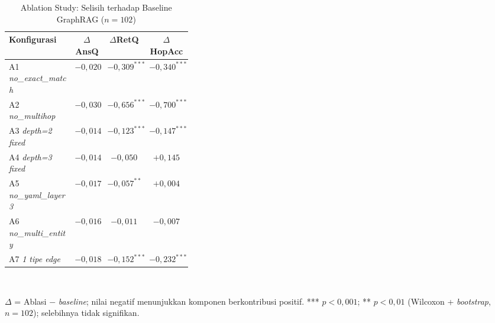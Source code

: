 \begin{table}[t]
\caption{Ablation Study: Selisih terhadap Baseline GraphRAG ($n=102$)}
\label{tbl:ablasi}
\centering
\begin{footnotesize}
\begin{tabular}{|p{0.36\linewidth}|c|c|c|}
\hline
\textbf{Konfigurasi} & \textbf{$\Delta$AnsQ} & \textbf{$\Delta$RetQ} & \textbf{$\Delta$HopAcc} \\
\hline
A1 \textit{no\_exact\_match} & $-0{,}020$ & $-0{,}309^{***}$ & $-0{,}340^{***}$ \\
\hline
A2 \textit{no\_multihop} & $-0{,}030$ & $-0{,}656^{***}$ & $-0{,}700^{***}$ \\
\hline
A3 \textit{depth=2 fixed} & $-0{,}014$ & $-0{,}123^{***}$ & $-0{,}147^{***}$ \\
\hline
A4 \textit{depth=3 fixed} & $-0{,}014$ & $-0{,}050$ & $+0{,}145$ \\
\hline
A5 \textit{no\_yaml\_layer3} & $-0{,}017$ & $-0{,}057^{**}$ & $+0{,}004$ \\
\hline
A6 \textit{no\_multi\_entity} & $-0{,}016$ & $-0{,}011$ & $-0{,}007$ \\
\hline
A7 \textit{1 tipe edge} & $-0{,}018$ & $-0{,}152^{***}$ & $-0{,}232^{***}$ \\
\hline
\end{tabular}
\\[4pt]
{\footnotesize \raggedright $\Delta$ = Ablasi $-$ \textit{baseline}; nilai negatif menunjukkan komponen berkontribusi positif. *** $p<0{,}001$; ** $p<0{,}01$ (Wilcoxon + \textit{bootstrap}, $n=102$); selebihnya tidak signifikan.\par}
\end{footnotesize}
\end{table}
